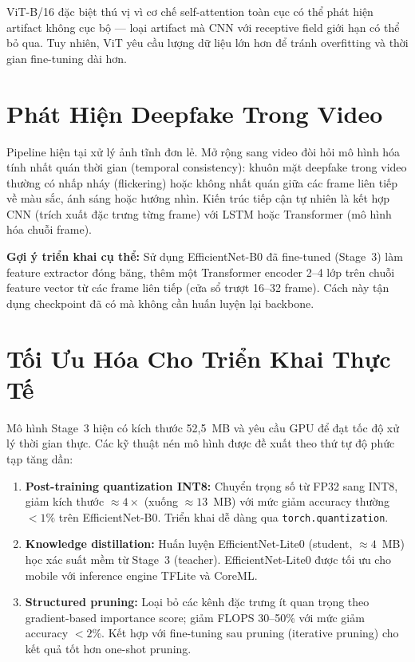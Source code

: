 ViT-B/16 đặc biệt thú vị vì cơ chế self-attention toàn cục có thể phát hiện artifact không cục bộ --- loại artifact mà CNN với receptive field giới hạn có thể bỏ qua. Tuy nhiên, ViT yêu cầu lượng dữ liệu lớn hơn để tránh overfitting và thời gian fine-tuning dài hơn.

\section{Phát Hiện Deepfake Trong Video}

Pipeline hiện tại xử lý ảnh tĩnh đơn lẻ. Mở rộng sang video đòi hỏi mô hình hóa tính nhất quán thời gian (temporal consistency): khuôn mặt deepfake trong video thường có nhấp nháy (flickering) hoặc không nhất quán giữa các frame liên tiếp về màu sắc, ánh sáng hoặc hướng nhìn. Kiến trúc tiếp cận tự nhiên là kết hợp CNN (trích xuất đặc trưng từng frame) với LSTM hoặc Transformer (mô hình hóa chuỗi frame).

\textbf{Gợi ý triển khai cụ thể:} Sử dụng EfficientNet-B0 đã fine-tuned (Stage~3) làm feature extractor đóng băng, thêm một Transformer encoder 2--4 lớp trên chuỗi feature vector từ các frame liên tiếp (cửa sổ trượt 16--32 frame). Cách này tận dụng checkpoint đã có mà không cần huấn luyện lại backbone.

\section{Tối Ưu Hóa Cho Triển Khai Thực Tế}

Mô hình Stage~3 hiện có kích thước 52,5~MB và yêu cầu GPU để đạt tốc độ xử lý thời gian thực. Các kỹ thuật nén mô hình được đề xuất theo thứ tự độ phức tạp tăng dần:

\begin{enumerate}
  \item \textbf{Post-training quantization INT8:} Chuyển trọng số từ FP32 sang INT8, giảm kích thước $\approx 4\times$ (xuống $\approx 13$~MB) với mức giảm accuracy thường $< 1\%$ trên EfficientNet-B0. Triển khai dễ dàng qua \texttt{torch.quantization}.

  \item \textbf{Knowledge distillation:} Huấn luyện EfficientNet-Lite0 (student, $\approx 4$~MB) học xác suất mềm từ Stage~3 (teacher). EfficientNet-Lite0 được tối ưu cho mobile với inference engine TFLite và CoreML.

  \item \textbf{Structured pruning:} Loại bỏ các kênh đặc trưng ít quan trọng theo gradient-based importance score; giảm FLOPS 30--50\% với mức giảm accuracy $< 2\%$. Kết hợp với fine-tuning sau pruning (iterative pruning) cho kết quả tốt hơn one-shot pruning.
\end{enumerate}

